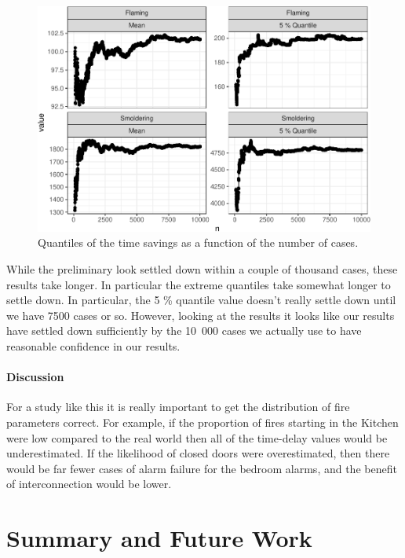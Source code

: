 \documentclass[12pt,twoside]{book}
\begin{document}
\begin{figure}[h!]
\centering
\includegraphics[width=4.5in]{FIGURES/cvg_plot-1.pdf}
\caption{Quantiles of the time savings as a function of the number of cases.}
\label{Ex_3-quintiles}
\end{figure}

While the preliminary look settled down within a couple of thousand cases, these results take longer. In particular the extreme quantiles take somewhat longer to settle down. In particular, the 5 \% quantile value doesn't really settle down until we have 7500 cases or so. However, looking at the results it looks like our results have settled down sufficiently by the 10~000 cases we actually use to have reasonable confidence in our results.

\hypertarget{discussion}{%
\subsubsection{Discussion}\label{discussion}}

For a study like this it is really important to get the distribution of fire parameters correct. For example, if the proportion of fires starting in the Kitchen were low compared to the real world then all of the time-delay values would be underestimated. If the likelihood of closed doors were overestimated, then there would be far fewer cases of alarm failure for the bedroom alarms, and the benefit of interconnection would be lower.

%
%

\chapter{Summary and Future Work}
\end{document}
